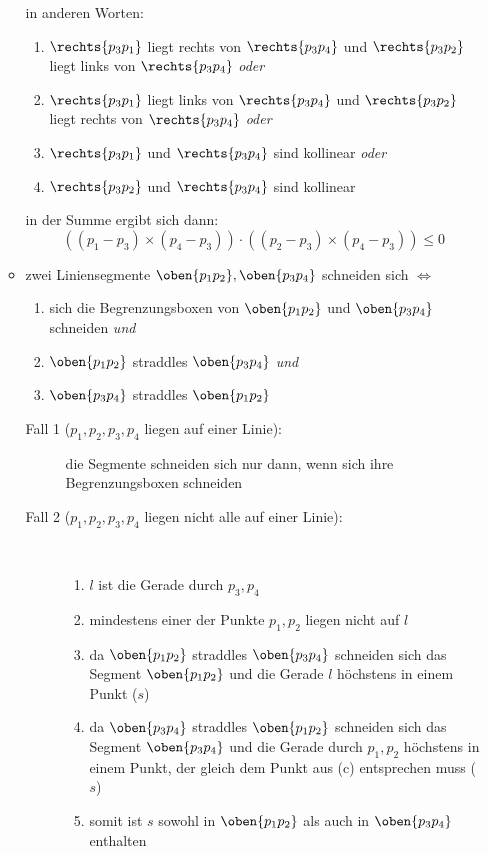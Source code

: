 \begin{enumerate}
\begin{itemize}
\begin{itemize}
				\end{itemize}
				in anderen Worten:
				\begin{enumerate}
					\item $\rechts{p_3p_1}$ liegt rechts von $\rechts{p_3p_4}$ und $\rechts{p_3p_2}$ liegt links von $\rechts{p_3p_4}$ \textit{oder}
					\item $\rechts{p_3p_1}$ liegt links von $\rechts{p_3p_4}$ und $\rechts{p_3p_2}$ liegt rechts von $\rechts{p_3p_4}$ \textit{oder}
					\item $\rechts{p_3p_1}$ und $\rechts{p_3p_4}$ sind kollinear \textit{oder}
					\item $\rechts{p_3p_2}$ und $\rechts{p_3p_4}$ sind kollinear
				\end{enumerate}
				in der Summe ergibt sich dann:\vspace*{-0.5\baselineskip}
				\[((p_1-p_3)\times(p_4-p_3)) \cdot ((p_2-p_3)\times (p_4-p_3)) \leq 0\]
			\item zwei Liniensegmente $\oben{p_1p_2},\oben{p_3p_4}$ schneiden sich $\Longleftrightarrow$
				\begin{enumerate}
					\item sich die Begrenzungsboxen von $\oben{p_1p_2}$ und $\oben{p_3p_4}$ schneiden \textit{und}
					\item $\oben{p_1p_2}$ straddles $\oben{p_3p_4}$ \textit{und}
					\item $\oben{p_3p_4}$ straddles $\oben{p_1p_2}$
				\end{enumerate}
				\up\Proof
					\begin{description}
						\item[Fall 1 ($p_1,p_2,p_3,p_4$ liegen auf einer Linie):] die Segmente schneiden sich nur dann, wenn sich ihre Begrenzungsboxen schneiden
						\item[Fall 2 ($p_1,p_2,p_3,p_4$ liegen nicht alle auf einer Linie):] \ \\\up
							\begin{enumerate}
								\item $l$ ist die Gerade durch $p_3,p_4$
								\item mindestens einer der Punkte $p_1,p_2$ liegen nicht auf $l$
								\item da $\oben{p_1p_2}$ straddles $\oben{p_3p_4}$ schneiden sich das Segment $\oben{p_1p_2}$ und die Gerade $l$ höchstens in einem Punkt ($s$)
								\item da $\oben{p_3p_4}$ straddles $\oben{p_1p_2}$ schneiden sich das Segment $\oben{p_3p_4}$ und die Gerade durch $p_1,p_2$ höchstens in einem Punkt, der gleich dem Punkt aus (c) entsprechen muss ($s$)
								\item somit ist $s$ sowohl in $\oben{p_1p_2}$ als auch in $\oben{p_3p_4}$ enthalten
							\end{enumerate}
					\end{description}
		\end{itemize}
\end{enumerate}